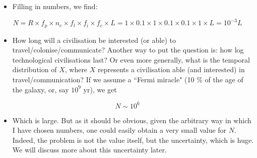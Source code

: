 \begin{frame}
\begin{itemize}

\item Filling in numbers, we find:
\end{itemize}

$$
N = R \times f_p \times n_e \times f_l \times f_i \times f_c \times L =
1 \times 0.1 \times 1 \times 0.1 \times 0.1 \times 1 \times L =  10^{-3} L
$$

\begin{itemize}

\item How long will a civilisation be interested (or able) to travel/colonise/communicate? Another way to put the question is: how log technological civilisations last? Or even more generally, what is the temporal distribution of $X$, where $X$ represents a civilisation able (and interested) in travel/communication? If we assume a ``Fermi miracle" (10 \% of the age of the galaxy, or, say $10^9$ yr), we get 
\end{itemize}

$$ N \sim 10^6 $$
\begin{itemize}

\item Which is large. But as it should be obvious, given the arbitrary way in which I have chosen numbers, one could easily obtain a very small value for $N$. Indeed, the problem is not the value itself, but the uncertainty, which is huge. We will discuss more about this uncertainty later.  
\end{itemize}
\end{frame}



